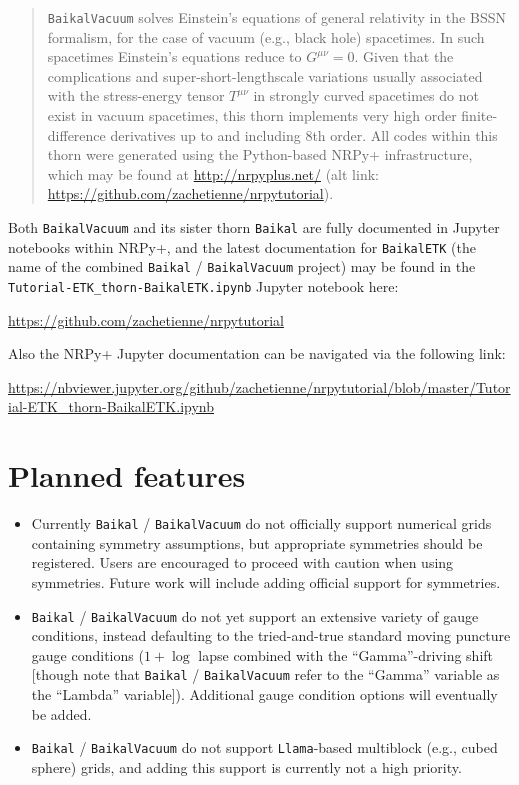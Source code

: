 \begin{abstract}
\texttt{BaikalVacuum} solves Einstein's equations of general
relativity in the BSSN formalism, for the case of vacuum (e.g., black
hole) spacetimes. In such spacetimes Einstein's equations reduce to
$G^{\mu \nu}=0$. Given that the complications and
super-short-lengthscale variations usually associated with the
stress-energy tensor $T^{\mu\nu}$ in strongly curved spacetimes do not
exist in vacuum spacetimes, this thorn implements very high order
finite-difference derivatives up to and including 8th order. All codes
within this thorn were generated using the Python-based NRPy+
infrastructure, which may be found at \url{http://nrpyplus.net/} (alt
link: \url{https://github.com/zachetienne/nrpytutorial}).
\end{abstract}

Both \texttt{BaikalVacuum} and its sister thorn \texttt{Baikal} are
fully documented in Jupyter notebooks within NRPy+, and
the latest documentation for \texttt{BaikalETK} (the name of the
combined \texttt{Baikal} / \texttt{BaikalVacuum} project) may be found
in the \texttt{Tutorial-ETK\_thorn-BaikalETK.ipynb} Jupyter notebook here:

\url{https://github.com/zachetienne/nrpytutorial}

Also the NRPy+ Jupyter documentation can be navigated via the
following link:

\url{https://nbviewer.jupyter.org/github/zachetienne/nrpytutorial/blob/master/Tutorial-ETK_thorn-BaikalETK.ipynb}

\section{Planned features}

\begin{itemize}
\item Currently \texttt{Baikal} / \texttt{BaikalVacuum} do not officially
support numerical grids containing symmetry assumptions, but
appropriate symmetries should be registered. Users are encouraged to
proceed with caution when using symmetries. Future work will include adding
official support for symmetries.
\item \texttt{Baikal} / \texttt{BaikalVacuum} do not yet support an
  extensive variety of gauge conditions, instead defaulting to the
  tried-and-true standard moving puncture gauge conditions ($1+\log$
  lapse combined with the ``Gamma''-driving shift [though note that
    \texttt{Baikal} / \texttt{BaikalVacuum} refer to the  ``Gamma''
    variable as the ``Lambda'' variable]). Additional gauge condition
  options will eventually be added.
\item \texttt{Baikal} / \texttt{BaikalVacuum} do not support
  \texttt{Llama}-based multiblock (e.g., cubed sphere) grids, and
  adding this support is currently not a high priority.
\end{itemize}





